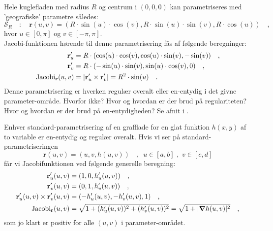 \begin{example} \label{exampKugleflade}
Hele kuglefladen med radius $R$ og centrum i $(0,0,0)$ kan parametriseres med 'geografiske' parametre således:
\begin{equation}
\mathcal{S}_{R} \quad : \quad \mathbf{r}(u,v) = (R\cdot\sin(u)\cdot \cos(v), R\cdot \sin(u)\cdot \sin(v), R\cdot \cos(u)) \quad ,
\end{equation}
hvor $u \in [0, \pi]$ og $v \in [-\pi , \pi ]$. \\

Jacobi-funktionen hørende til denne parametrisering fås af følgende beregninger:
\begin{equation}
\begin{aligned}
\mathbf{r}'_{u} &= R\cdot (\cos(u)\cdot\cos(v), \cos(u)\cdot \sin(v), -\sin(v)) \quad ,\\
\mathbf{r}'_{v} &= R\cdot (-\sin(u)\cdot \sin(v), \sin(u)\cdot \cos(v), 0) \quad ,\\
\operatorname{Jacobi}_{\mathbf{r}}(u,v) &= |\mathbf{r}'_{u} \times \mathbf{r}'_{v}| = R^{2} \cdot \sin(u) \quad.
\end{aligned}
\end{equation}
Denne parametrisering er hverken regulær overalt eller en-entydig i det givne parameter-område. Hvorfor ikke? Hvor og hvordan er der brud på regulariteten? Hvor og hvordan er der brud på en-entydigheden? Se afnit  i .
\end{example}


\begin{example}[Grafflader] \label{exampGraffladeParamRegul}
Enhver standard-parametrisering af en grafflade for en glat funktion $h(x,y)$ af to variable er en-entydig og regulær overalt.
Hvis vi ser på standard-parametriseringen
\begin{equation}
\mathbf{r}(u,v) = (u, v, h(u,v)) \quad , \, \, \,  u \in [a,b] \, \,
, \, \,  v \in [c,d]
\end{equation}
får vi
Jacobifunktionen ved følgende generelle beregning:
\begin{equation}
\begin{aligned}
\mathbf{r}'_{u}(u,v) &= (1, 0, h'_{u}(u,v)) \quad ,\\
\mathbf{r}'_{v}(u,v) &= (0, 1, h'_{v}(u,v)) \quad ,\\
\mathbf{r}'_{u}(u,v) \times \mathbf{r}'_{v}(u,v) &= (-h'_{u}(u,v), -h'_{v}(u,v), 1) \quad , \\
\operatorname{Jacobi}_{\mathbf{r}}(u,v) &= \sqrt{1 + (h'_{u}(u,v))^{2} + (h'_{v}(u,v))^{2}} = \sqrt{1 + |\bm{\nabla}h(u,v)|^{2}}  \quad , 
\end{aligned}
\end{equation}
som jo klart er positiv for alle $(u,v)$ i parameter-området.
\end{example}


